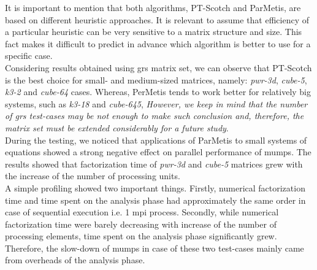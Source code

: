 It is important to mention that both algorithms, PT-Scotch and ParMetis, are based on different heuristic approaches. It is relevant to assume that efficiency of a particular heuristic can be very sensitive to a matrix structure and size. This fact makes it difficult to predict in advance which algorithm is better to use for a specific case.\\


Considering results obtained using \acrshort{grs} matrix set, we can observe that PT-Scotch is the best choice for small- and medium-sized matrices, namely: \textit{pwr-3d}, \textit{cube-5}, \textit{k3-2} and \textit{cube-64} cases. Whereas, PerMetis tends to work better for relatively big systems, such as \textit{k3-18} and \textit{cube-645}, \textit{However, we keep in mind that the number of \acrshort{grs} test-cases may be not enough to make such conclusion and, therefore, the matrix set must be extended considerably for a future study}.\\


During the testing, we noticed that applications of ParMetis to small systems of equations showed a strong negative effect on parallel performance of \acrshort{mumps}. The results showed that factorization time of \textit{pwr-3d} and \textit{cube-5} matrices grew with the increase of the number of processing units.\\%




A simple profiling showed two important things. Firstly, numerical factorization time and time spent on the analysis phase had approximately the same order in case of sequential execution i.e. 1 \acrshort{mpi} process. Secondly, while numerical factorization time were barely decreasing with increase of the number of processing elements, time spent on the analysis phase significantly grew. Therefore, the slow-down of \acrshort{mumps} in case of these two test-cases mainly came from overheads of the analysis phase.\\


